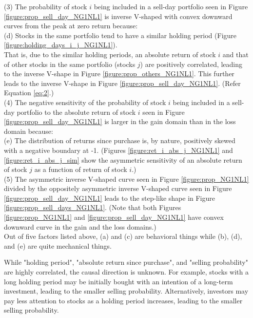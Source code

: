 \documentclass[11pt, a4paper]{article}
\begin{document}
\noindent
(3) The probability of stock $i$ being included in a sell-day portfolio seen in Figure \ref{figure:prop_sell_day_NG1NL1} is inverse V-shaped with convex downward curves from the peak at zero return because:\\
\noindent
(d) Stocks in the same portfolio tend to have a similar holding period (Figure \ref{figure:holding_days_i_j_NG1NL1}).\\
That is, due to the similar holding periods, an absolute return of stock $i$ and that of other stocks in the same portfolio (stocks $j$) are positively correlated, leading to the inverse V-shape in Figure \ref{figure:prop_others_NG1NL1}. This further leads to the inverse V-shape in Figure \ref{figure:prop_sell_day_NG1NL1}. (Refer Equation \ref{eq:2}.)\\

\noindent
(4) The negative sensitivity of the probability of stock $i$ being included in a sell-day portfolio to the absolute return of stock $i$ seen in Figure \ref{figure:prop_sell_day_NG1NL1} is larger in the gain domain than in the loss domain because:\\
\noindent
(e) The distribution of returns since purchase is, by nature, positively skewed with a negative boundary at -1. (Figures \ref{figure:ret_i_abs_j_NG1NL1} and \ref{figure:ret_i_abs_j_sim} show the asymmetric sensitivity of an absolute return of stock $j$ as a function of return of stock $i$.)\\

\noindent
(5) The asymmetric inverse V-shaped curve seen in Figure \ref{figure:prop_NG1NL1} divided by the oppositely asymmetric inverse V-shaped curve seen in Figure \ref{figure:prop_sell_day_NG1NL1} leads to the step-like shape in Figure \ref{figure:prop_sell_days_NG1NL1}. (Note that both Figures  \ref{figure:prop_NG1NL1} and \ref{figure:prop_sell_day_NG1NL1} have convex downward curve in the gain and the loss domains.)\\

Out of five factors listed above, (a) and (c) are behavioral things while (b), (d), and (e) are quite mechanical things.

While "holding period", "absolute return since purchase", and "selling probability" are highly correlated, the causal direction is unknown. For example, stocks with a long holding period may be initially bought with an intention of a long-term investment, leading to the smaller selling probability. Alternatively, investors may pay less attention to stocks as a holding period increases, leading to the smaller selling probability.
\end{document}
